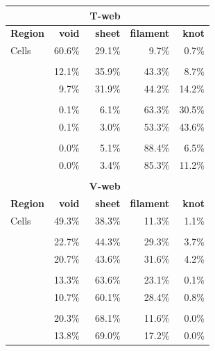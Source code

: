\documentclass[a4,useAMS,usenatbib,usegraphicx]{latex/mn2e}
\begin{document}
\begin{table}[H]
\begin{flushleft}
\begin{center}
  \begin{tabular}{l  r  r  r  r}
  	&&\textbf{T-web}&&\\\hline\hline
	\textbf{Region}	&\textbf{void}&\textbf{sheet}&\textbf{filament}&\textbf{knot}	\\\hline
	Cells			&	60.6\%	  &		29.1\%	 &		9.7\%	   &	0.7\%		\\
	&&&&\\	
	\GHFOF			& 	12.1\%	  &		35.9\%	 &		43.3\%	   &	8.7\%		\\
	\GHBDM			&	9.7\%	  &		31.9\%	 &		44.2\%	   &	14.2\%		\\
	&&&&\\	
	\IPFOF			&	0.1\%	  &		6.1\%	 &		63.3\%	   &	30.5\%		\\
	\IPBDM			&	0.1\%	  &		3.0\%	 &		53.3\%	   &	43.6\%		\\
	&&&&\\
	\RIPFOF			&	0.0\%	  &		5.1\%	 &		88.4\%	   &	6.5\%		\\
	\RIPBDM			&	0.0\%	  &		3.4\%	 &		85.3\%	   &	11.2\%		\\\hline\hline
	&&&&\\
  	&&\textbf{V-web}&&\\\hline\hline
	\textbf{Region}	&\textbf{void}&\textbf{sheet}&\textbf{filament}&\textbf{knot}	\\\hline
	Cells			&	49.3\%	  &		38.3\%	 &		11.3\%	   &	1.1\%		\\
	&&&&\\
	\GHFOF			&	22.7\%	  &		44.3\%	 &		29.3\%	   &	3.7\%		\\
	\GHBDM			&	20.7\%	  &		43.6\%	 &		31.6\%	   &	4.2\%		\\
	&&&&\\
	\IPFOF			&	13.3\%	  &		63.6\%	 &		23.1\%	   &	0.1\%		\\
	\IPBDM			&	10.7\%	  &		60.1\%	 &		28.4\%	   &	0.8\%		\\
	&&&&\\
	\RIPFOF			&	20.3\%	  &		68.1\%	 &		11.6\%	   &	0.0\%		\\
	\RIPBDM			&	13.8\%	  &		69.0\%	 &		17.2\%	   &	0.0\%		\\\hline\hline
  \end{tabular}  
  
  \label{tab:OccupationFractions}
  
\end{center}
\end{flushleft}
\end{table}
\end{document}
